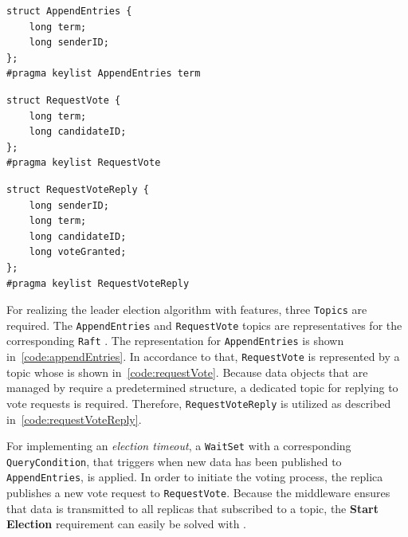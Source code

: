 \lstset{language=C}
\begin{lstlisting}[caption={\abr{IDL} definition for the \texttt{AppendEntries} topic. The \texttt{term} variable represents the latest term that the replica has seen, while the \texttt{senderID} encodes which replica sent this message.}, label=code:appendEntries]
struct AppendEntries {
    long term;
    long senderID;
};
#pragma keylist AppendEntries term
\end{lstlisting}

\begin{lstlisting}[caption={\abr{IDL} definition for the \texttt{RequestVote} topic. The \texttt{term} variable represents the candidate's term, while \texttt{candidateID} encodes the candidate that requested the vote.}, label=code:requestVote]
struct RequestVote {
    long term;
    long candidateID;
};
#pragma keylist RequestVote
\end{lstlisting}

\begin{lstlisting}[caption={\abr{IDL} definition for the \texttt{RequestVoteReply} topic. The \texttt{term} encodes the sender's term for the candidate to update itself. \texttt{voteGranted} shows whether the replica granted the vote request for the given term. The \texttt{candidateID} and \texttt{senderID} are used to identify which replica granted the vote for which replica respectively.}, label=code:requestVoteReply]
struct RequestVoteReply {
    long senderID;
    long term;
    long candidateID;
    long voteGranted;
};
#pragma keylist RequestVoteReply
\end{lstlisting}

For realizing the leader election algorithm with  features, three \texttt{Topics} are required.
The \texttt{AppendEntries} and \texttt{RequestVote} topics are representatives for the corresponding \texttt{Raft} .
The  representation for \texttt{AppendEntries} is shown in~\autoref{code:appendEntries}.
In accordance to that, \texttt{RequestVote} is represented by a topic whose  is shown in~\autoref{code:requestVote}.
Because data objects that are managed by  require a predetermined structure, a dedicated topic for replying to vote requests is required.
Therefore, \texttt{RequestVoteReply} is utilized as described in~\autoref{code:requestVoteReply}.

For implementing an \textit{election timeout}, a \texttt{WaitSet} with a corresponding \texttt{QueryCondition}, that triggers when new data has been published to \texttt{AppendEntries}, is applied.
In order to initiate the voting process, the replica publishes a new vote request to \texttt{RequestVote}.
Because the middleware ensures that data is transmitted to all replicas that subscribed to a topic, the \textbf{Start Election} requirement can easily be solved with .

